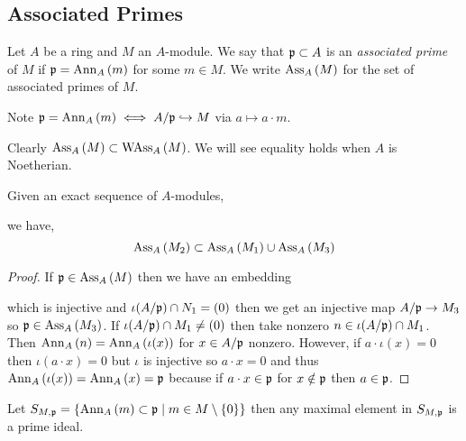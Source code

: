 \documentclass[12pt]{article}
\begin{document}
\subsection{Associated Primes}

\begin{defn}
Let $A$ be a ring and $M$ an $A$-module. We say that $\mathfrak{p} \subset A$ is an \textit{associated prime} of $M$ if $\mathfrak{p} = \mathrm{Ann}_{A}\left(m\right)$ for some $m \in M$. We write $\mathrm{Ass}_{A}\left( M \right)$ for the set of associated primes of $M$.
\end{defn}

\begin{rmk}
Note $\mathfrak{p} = \mathrm{Ann}_{A}\left(m\right) \iff A / \mathfrak{p} \hookrightarrow M$ via $a \mapsto a \cdot m$.
\end{rmk}

\begin{rmk}
Clearly $\mathrm{Ass}_{A}\left( M \right) \subset \mathrm{WAss}_{A}\left(M \right)$. We will see equality holds when $A$ is Noetherian.
\end{rmk}


\begin{lemma}
Given an exact sequence of $A$-modules,
\begin{center}
\end{center}
we have, 
\[ \mathrm{Ass}_{A}\left( M_2 \right) \subset \mathrm{Ass}_{A}\left( M_1 \right) \cup \mathrm{Ass}_{A}\left( M_3 \right) \]
\end{lemma}

\begin{proof}
If $\mathfrak{p} \in \mathrm{Ass}_{A}\left( M \right)$ then we have an embedding
\begin{center}
\end{center}
which is injective and $\iota(A / \mathfrak{p}) \cap N_1 = (0)$
then we get an injective map $A / \mathfrak{p} \to M_3$ so $\mathfrak{p} \in \mathrm{Ass}_{A}\left( M_3 \right)$. If $\iota(A / \mathfrak{p}) \cap M_1 \neq (0)$ then take nonzero $n \in \iota(A / \mathfrak{p}) \cap M_1$. Then $\mathrm{Ann}_{A}\left(n\right) = \mathrm{Ann}_{A}\left(\iota(x)\right)$ for $x \in A / \mathfrak{p}$ nonzero. However, if $a \cdot \iota(x) = 0$ then $\iota(a \cdot x) = 0$ but $\iota$ is injective so $a \cdot x = 0$ and thus $\mathrm{Ann}_{A}\left(\iota(x)\right) = \mathrm{Ann}_{A}\left(x\right) = \mathfrak{p}$ because if $a \cdot x \in \mathfrak{p}$ for $x \notin \mathfrak{p}$ then $a \in \mathfrak{p}$. 
\end{proof}

\begin{lemma}
Let $S_{M, \mathfrak{p}} = \{ \mathrm{Ann}_{A}\left(m\right) \subset \mathfrak{p} \mid m \in M \setminus \{0\} \}$ then any maximal element in $S_{M, \mathfrak{p}}$ is a prime ideal.
\end{lemma}
\end{document}
